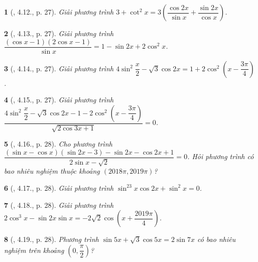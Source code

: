 \documentclass{article}
\newtheorem{baitoan}{}
\begin{document}
\begin{baitoan}[\cite{Hung_nang_cao_phat_trien_Toan_11_tap_1}, 4.12., p. 27]
	Giải phương trình $3 + \cot^2x = 3\left(\dfrac{\cos2x}{\sin x} + \dfrac{\sin2x}{\cos x}\right)$.
\end{baitoan}

\begin{baitoan}[\cite{Hung_nang_cao_phat_trien_Toan_11_tap_1}, 4.13., p. 27]
	Giải phương trình $\dfrac{(\cos x - 1)(2\cos x - 1)}{\sin x} = 1 - \sin2x + 2\cos^2x$.
\end{baitoan}

\begin{baitoan}[\cite{Hung_nang_cao_phat_trien_Toan_11_tap_1}, 4.14., p. 27]
	Giải phương trình $4\sin^2\dfrac{x}{2} - \sqrt{3}\cos2x = 1 + 2\cos^2\left(x - \dfrac{3\pi}{4}\right)$.
\end{baitoan}

\begin{baitoan}[\cite{Hung_nang_cao_phat_trien_Toan_11_tap_1}, 4.15., p. 27]
	Giải phương trình $\dfrac{4\sin^2\dfrac{x}{2} - \sqrt{3}\cos2x - 1 - 2\cos^2\left(x - \dfrac{3\pi}{4}\right)}{\sqrt{2\cos3x + 1}} = 0$.
\end{baitoan}

\begin{baitoan}[\cite{Hung_nang_cao_phat_trien_Toan_11_tap_1}, 4.16., p. 28]
	Cho phương trình $\dfrac{(\sin x - \cos x)(\sin2x - 3) - \sin2x - \cos2x + 1}{2\sin x - \sqrt{2}} = 0$. Hỏi phương trình có bao nhiêu nghiệm thuộc khoảng $(2018\pi,2019\pi)$?
\end{baitoan}

\begin{baitoan}[\cite{Hung_nang_cao_phat_trien_Toan_11_tap_1}, 4.17., p. 28]
	Giải phương trình $\sin^23x\cos2x + \sin^2x = 0$.
\end{baitoan}

\begin{baitoan}[\cite{Hung_nang_cao_phat_trien_Toan_11_tap_1}, 4.18., p. 28]
	Giải phương trình $2\cos^3x - \sin2x\sin x = -2\sqrt{2}\cos\left(x + \dfrac{2019\pi}{4}\right)$.
\end{baitoan}

\begin{baitoan}[\cite{Hung_nang_cao_phat_trien_Toan_11_tap_1}, 4.19., p. 28]
	Phương trình $\sin5x + \sqrt{3}\cos5x = 2\sin7x$ có bao nhiêu nghiệm trên khoảng $\left(0,\dfrac{\pi}{2}\right)$?
\end{baitoan}

\end{document}
